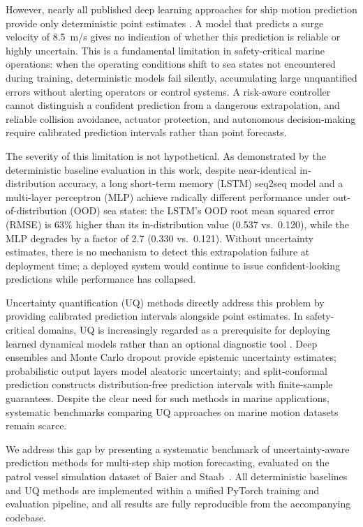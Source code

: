 \documentclass[a4paper,fleqn]{cas-sc}
\begin{document}
However, nearly all published deep learning approaches for ship motion prediction provide only deterministic point estimates \cite{silva2022ship, zhang2023deep, gong2025wavelet, schirmann2022datadriven}. A model that predicts a surge velocity of 8.5~m/s gives no indication of whether this prediction is reliable or highly uncertain. This is a fundamental limitation in safety-critical marine operations: when the operating conditions shift to sea states not encountered during training, deterministic models fail silently, accumulating large unquantified errors without alerting operators or control systems. A risk-aware controller cannot distinguish a confident prediction from a dangerous extrapolation, and reliable collision avoidance, actuator protection, and autonomous decision-making require calibrated prediction intervals rather than point forecasts.

The severity of this limitation is not hypothetical. As demonstrated by the deterministic baseline evaluation in this work, despite near-identical in-distribution accuracy, a long short-term memory (LSTM) seq2seq model and a multi-layer perceptron (MLP) achieve radically different performance under out-of-distribution (OOD) sea states: the LSTM's OOD root mean squared error (RMSE) is 63\% higher than its in-distribution value (0.537 vs.\ 0.120), while the MLP degrades by a factor of 2.7 (0.330 vs.\ 0.121). Without uncertainty estimates, there is no mechanism to detect this extrapolation failure at deployment time; a deployed system would continue to issue confident-looking predictions while performance has collapsed.

Uncertainty quantification (UQ) methods directly address this problem by providing calibrated prediction intervals alongside point estimates. In safety-critical domains, UQ is increasingly regarded as a prerequisite for deploying learned dynamical models rather than an optional diagnostic tool \cite{lakshminarayanan2017, gal2016dropout, ovadia2019can}. Deep ensembles \cite{lakshminarayanan2017} and Monte Carlo dropout \cite{gal2016dropout} provide epistemic uncertainty estimates; probabilistic output layers model aleatoric uncertainty; and split-conformal prediction constructs distribution-free prediction intervals with finite-sample guarantees. Despite the clear need for such methods in marine applications, systematic benchmarks comparing UQ approaches on marine motion datasets remain scarce.

We address this gap by presenting a systematic benchmark of uncertainty-aware prediction methods for multi-step ship motion forecasting, evaluated on the patrol vessel simulation dataset of Baier and Staab~\cite{baier2022darus}. All deterministic baselines and UQ methods are implemented within a unified PyTorch training and evaluation pipeline, and all results are fully reproducible from the accompanying codebase.
\end{document}
